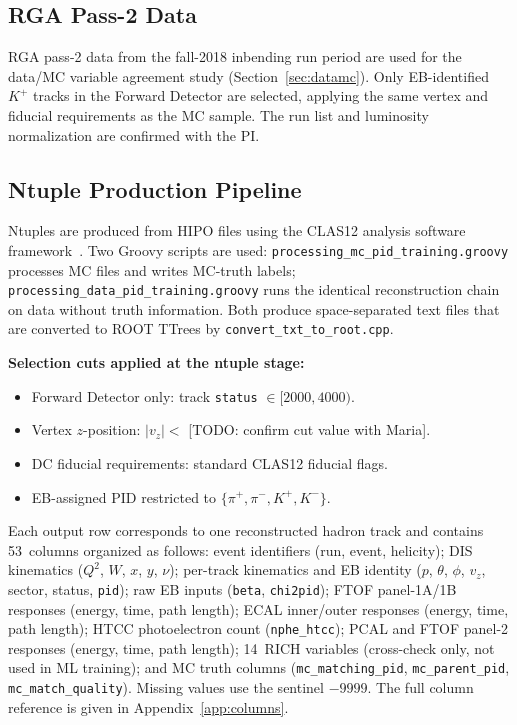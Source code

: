 \documentclass[11pt]{article}
\newcommand{\Kp}{K^{+}}
\newcommand{\pip}{\pi^{+}}
\begin{document}
\subsection{RGA Pass-2 Data}
RGA pass-2 data from the fall-2018 inbending run period are used for the
data/MC variable agreement study (Section~\ref{sec:datamc}).
Only EB-identified $\Kp$ tracks in the Forward Detector are selected,
applying the same vertex and fiducial requirements as the MC sample.
The run list and luminosity normalization are confirmed with the PI.

\subsection{Ntuple Production Pipeline}
\label{sec:pipeline}

Ntuples are produced from HIPO files using the CLAS12 analysis software
framework~\cite{Burkert2020}.
Two Groovy scripts are used:
\texttt{processing\_mc\_pid\_training.groovy} processes MC files and writes
MC-truth labels; \texttt{processing\_data\_pid\_training.groovy} runs the
identical reconstruction chain on data without truth information.
Both produce space-separated text files that are converted to ROOT TTrees
by \texttt{convert\_txt\_to\_root.cpp}.

\textbf{Selection cuts applied at the ntuple stage:}
\begin{itemize}
  \item Forward Detector only: track \texttt{status} $\in [2000, 4000)$.
  \item Vertex $z$-position: $|v_z|<$ [TODO: confirm cut value with Maria].
  \item DC fiducial requirements: standard CLAS12 fiducial flags.
  \item EB-assigned PID restricted to $\{\pip, \pi^-, \Kp, K^-\}$.
\end{itemize}

Each output row corresponds to one reconstructed hadron track and contains
53~columns organized as follows:
event identifiers (run, event, helicity);
DIS kinematics ($Q^2$, $W$, $x$, $y$, $\nu$);
per-track kinematics and EB identity ($p$, $\theta$, $\phi$, $v_z$, sector,
status, \texttt{pid});
raw EB inputs (\texttt{beta}, \texttt{chi2pid});
FTOF panel-1A/1B responses (energy, time, path length);
ECAL inner/outer responses (energy, time, path length);
HTCC photoelectron count (\texttt{nphe\_htcc});
PCAL and FTOF panel-2 responses (energy, time, path length);
14~RICH variables (cross-check only, not used in ML training);
and MC truth columns (\texttt{mc\_matching\_pid}, \texttt{mc\_parent\_pid},
\texttt{mc\_match\_quality}).
Missing values use the sentinel $-9999$.
The full column reference is given in Appendix~\ref{app:columns}.
\end{document}

